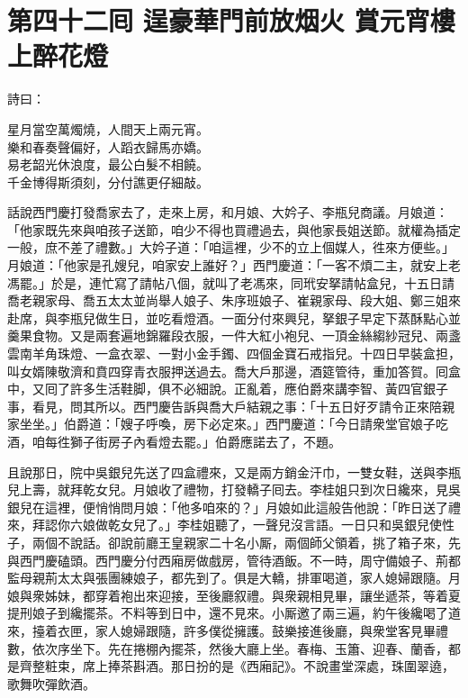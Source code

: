 
\chapter*{第四十二囘 逞豪華門前放烟火 賞元宵樓上醉花燈}


詩曰：

\begin{myquote}
星月當空萬燭燒，人間天上兩元宵。\\樂和春奏聲偏好，人蹈衣歸馬亦嬌。\\易老韶光休浪度，最公白髮不相饒。\\千金博得斯須刻，分付譙更仔細敲。
\end{myquote}

話說西門慶打發喬家去了，走來上房，和月娘、大妗子、李瓶兒商議。月娘道：「他家既先來與咱孩子送節，咱少不得也買禮過去，與他家長姐送節。就權為插定一般，庶不差了禮數。」大妗子道：「咱這裡，少不的立上個媒人，徃來方便些。」月娘道：「他家是孔嫂兒，咱家安上誰好？」西門慶道：「一客不煩二主，就安上老馮罷。」於是，連忙寫了請帖八個，就叫了老馮來，同玳安拏請帖盒兒，十五日請喬老親家母、喬五太太並尚舉人娘子、朱序班娘子、崔親家母、段大姐、鄭三姐來赴席，與李瓶兒做生日，並吃看燈酒。一面分付來興兒，拏銀子早定下蒸酥點心並羹果食物。又是兩套遍地錦羅段衣服，一件大紅小袍兒、一頂金絲縐紗冠兒、兩盞雲南羊角珠燈、一盒衣翠、一對小金手鐲、四個金寶石戒指兒。十四日早裝盒担，叫女婿陳敬濟和賁四穿青衣服押送過去。喬大戶那邊，酒筵管待，重加答賀。囘盒中，又囘了許多生活鞋脚，俱不必細說。正亂着，應伯爵來講李智、黃四官銀子事，看見，問其所以。西門慶告訴與喬大戶結親之事：「十五日好歹請令正來陪親家坐坐。」伯爵道：「嫂子呼喚，房下必定來。」西門慶道：「今日請衆堂官娘子吃酒，咱每徃獅子街房子內看燈去罷。」伯爵應諾去了，不題。

且說那日，院中吳銀兒先送了四盒禮來，又是兩方銷金汗巾，一雙女鞋，送與李瓶兒上壽，就拜乾女兒。月娘收了禮物，打發轎子囘去。李桂姐只到次日纔來，見吳銀兒在這裡，便悄悄問月娘：「他多咱來的？」月娘如此這般告他說：「昨日送了禮來，拜認你六娘做乾女兒了。」李桂姐聽了，一聲兒沒言語。一日只和吳銀兒使性子，兩個不說話。{}卻說前廳王皇親家二十名小厮，兩個師父領着，挑了箱子來，先與西門慶磕頭。西門慶分付西廂房做戲房，管待酒飯。不一時，周守備娘子、荊都監母親荊太太與張團練娘子，都先到了。俱是大轎，排軍喝道，家人媳婦跟隨。月娘與衆姊妹，都穿着袍出來迎接，至後廳叙禮。與衆親相見畢，讓坐遞茶，等着夏提刑娘子到纔擺茶。不料等到日中，還不見來。小厮邀了兩三遍，約午後纔喝了道來，擡着衣匣，家人媳婦跟隨，許多僕從擁護。鼓樂接進後廳，與衆堂客見畢禮數，依次序坐下。先在捲棚內擺茶，然後大廳上坐。春梅、玉簫、迎春、蘭香，都是齊整粧束，席上捧茶斟酒。那日扮的是《西廂記》。不說畫堂深處，珠圍翠遶，歌舞吹彈飲酒。

